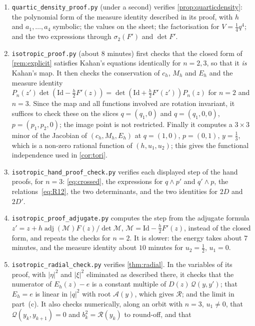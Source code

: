 \documentclass[11pt,a4paper]{article}
\theoremstyle{definition}
\theoremstyle{remark}
\newcommand{\Id}{\mathrm{Id}}
\begin{document}
\begin{enumerate}[leftmargin=*]
\item \texttt{quartic\_density\_proof.py} (under a second) verifies \cref{prop:quarticdensity}: the polynomial
  form of the measure identity described in its proof, with $h$ and $a_1,\dots,a_4$ symbolic; the values on the
  sheet; the factorisation for $V=\frac14q^4$; and the two expressions through $\sigma_2(F')$ and $\det F'$.
\item \texttt{isotropic\_proof.py} (about $8$ minutes) first checks that the closed form of \cref{rem:explicit}
  satisfies Kahan's equations identically for $n=2,3$, so that it \emph{is} Kahan's map. It then checks the
  conservation of $c_h$, $M_h$ and $E_h$ and the measure identity $P_n(z')\det(\Id-\frac h2F'(z))=\det(\Id+\frac
  h2F'(z'))P_n(z)$ for $n=2$ and $n=3$. Since the map and all functions involved are rotation invariant, it
  suffices to check these on the slices $q=(q_1,0)$ and $q=(q_1,0,0)$, $p=(p_1,p_2,0)$; the image point is not
  restricted. Finally it computes a $3\times3$ minor of the Jacobian of $(c_h,M_h,E_h)$ at $q=(1,0)$, $p=(0,1)$,
  $y=\frac13$, which is a non-zero rational function of $(h,u_1,u_2)$; this gives the functional independence
  used in \cref{cor:tori}.
\item \texttt{isotropic\_hand\_proof\_check.py} verifies each displayed step of the hand proofs, for $n=3$:
  \eqref{eq:crossed}, the expressions for $q\wedge p'$ and $q'\wedge p$, the relations~\eqref{eq:R12}, the two
  determinants, and the two identities for $2D$ and $2D'$.
\item \texttt{isotropic\_proof\_adjugate.py} computes the step from the adjugate formula
  $z'=z+h\operatorname{adj}(\mathcal M)F(z)/\det\mathcal M$, $\mathcal M=\Id-\frac h2F'(z)$, instead of the closed
  form, and repeats the checks for $n=2$. It is slower: the energy takes about $7$ minutes, and the measure
  identity about $10$ minutes for $u_2=\frac12$, $u_1=0$.
\item \texttt{isotropic\_radial\_check.py} verifies \cref{thm:radial}. In the variables of its proof, with
  $\lvert\eta\rvert^2$ and $\lvert\xi\rvert^2$ eliminated as described there, it checks that the numerator of
  $E_h(z)-e$ is a constant multiple of $D(z)\,\mathcal Q(y,y')$; that $E_h=e$ is linear in $\lvert q\rvert^2$
  with root $\mathcal A(y)$, which gives $\mathcal R$; and the limit in part~(c). It also checks numerically, along an
  orbit with $n=3$, $u_1\ne0$, that $\mathcal Q(y_k,y_{k+1})=0$ and $b_k^2=\mathcal R(y_k)$ to round-off, and that

\end{enumerate}
\end{document}
